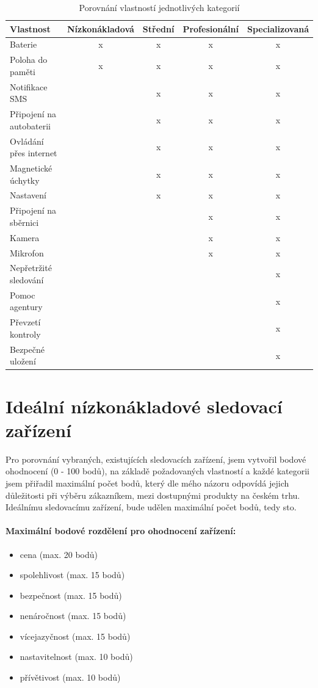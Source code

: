 \documentclass[FM,MP]{tulthesis}  %
\begin{document}
\renewcommand{\arraystretch}{1.5}
\begin{table}[H]
\begin{center}
\begin{tabular}{| l | c | c| c | c |}
\hline
Vlastnost & Nízkonákladová & Střední & Profesionální & Specializovaná\\
\hline
\hline
Baterie & x & x & x & x\\
\hline
Poloha do paměti & x & x & x & x\\
\hline
Notifikace SMS & & x & x & x\\
\hline
Připojení na autobaterii & & x & x & x\\
\hline
Ovládání přes internet & & x & x & x\\
\hline
Magnetické úchytky & & x & x & x\\
\hline
Nastavení & & x & x & x\\
\hline
Připojení na sběrnici & & & x & x\\
\hline
Kamera & & & x & x\\
\hline
Mikrofon & & & x & x\\
\hline
Nepřetržité sledování & & & & x\\
\hline
Pomoc agentury & & & & x\\
\hline
Převzetí kontroly & & & & x\\
\hline
Bezpečné uložení & & & & x\\
\hline
\end{tabular}
\end{center}
\caption{Porovnání vlastností jednotlivých kategorií}
\end{table}


\section{Ideální nízkonákladové sledovací zařízení}
Pro porovnání vybraných, existujících sledovacích zařízení, jsem vytvořil bodové ohodnocení (0 - 100 bodů), na základě požadovaných vlastností a každé kategorii jsem přiřadil maximální počet bodů, který dle mého názoru odpovídá jejich důležitosti při výběru zákazníkem, mezi dostupnými produkty na českém trhu. Ideálnímu sledovacímu zařízení, bude udělen maximální počet bodů, tedy sto.

\paragraph{Maximální bodové rozdělení pro ohodnocení zařízení:}
\begin{itemize}
\item cena (max. 20 bodů)
\item spolehlivost (max. 15 bodů)
\item bezpečnost (max. 15 bodů)
\item nenáročnost (max. 15 bodů)
\item vícejazyčnost (max. 15 bodů)
\item nastavitelnost (max. 10 bodů)
\item přívětivost (max. 10 bodů)
\end{itemize}
\end{document}
